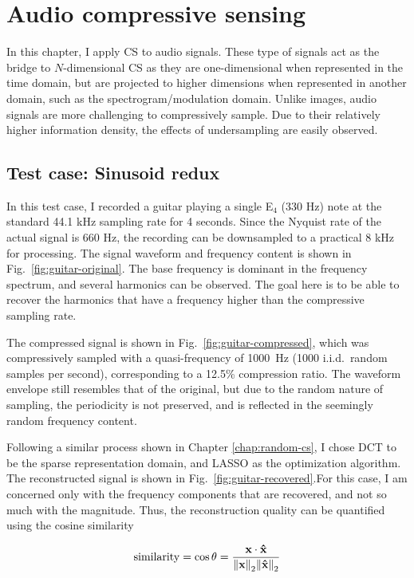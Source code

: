 \chapter{Audio compressive sensing}
\label{chap:audio-cs}
In this chapter, I apply CS to audio signals. These type of signals act as the bridge to $N$-dimensional CS as they are one-dimensional when represented in the time domain, but are projected to higher dimensions when represented in another domain, such as the spectrogram/modulation domain. Unlike images, audio signals are more challenging to compressively sample. Due to their relatively higher information density, the effects of undersampling are easily observed.

\section{Test case: Sinusoid redux}
\label{sec:audio-sine}
In this test case, I recorded a guitar playing a single E$_4$ (330 Hz) note at the standard 44.1 kHz sampling rate for 4 seconds. Since the Nyquist rate of the actual signal is 660 Hz, the recording can be downsampled to a practical 8 kHz for processing. The signal waveform and frequency content is shown in Fig.~\ref{fig:guitar-original}. The base frequency is dominant in the frequency spectrum, and several harmonics can be observed. The goal here is to be able to recover the harmonics that have a frequency higher than the compressive sampling rate.

The compressed signal is shown in Fig.~\ref{fig:guitar-compressed}, which was compressively sampled with a quasi-frequency of 1000~Hz (1000 i.i.d.~random samples per second), corresponding to a 12.5\% compression ratio. The waveform envelope still resembles that of the original, but due to the random nature of sampling, the periodicity is not preserved, and is reflected in the seemingly random frequency content.

Following a similar process shown in Chapter \ref{chap:random-cs}, I chose DCT to be the sparse representation domain, and LASSO as the optimization algorithm. The reconstructed signal is shown in Fig.~\ref{fig:guitar-recovered}.For this case, I am concerned only with the frequency components that are recovered, and not so much with the magnitude. Thus, the reconstruction quality can be quantified using the cosine similarity

\begin{equation}
\label{eq:cossim}
\mathrm{similarity} = \cos\theta = \frac{\text{\bfseries x} \cdot \bm\hat{\text{\bfseries x}}}{\norm{\text{\bfseries x}}_2 \norm{\bm\hat{\text{\bfseries x}}}_2}
\end{equation}

